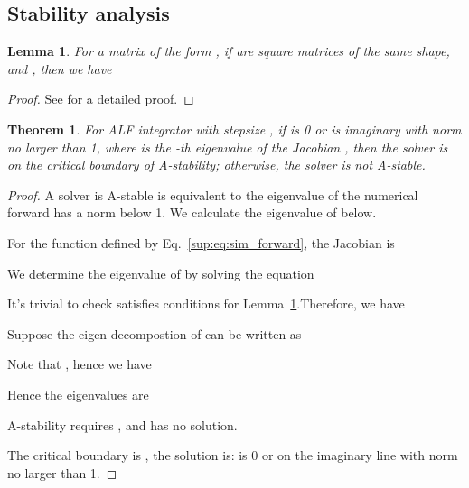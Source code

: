 \documentclass{article} \usepackage{iclr2021_conference,times}
\newtheorem{theorem}{Theorem}[section]
\newtheorem{lemma}{Lemma}[theorem]
\begin{document}
\subsection{Stability analysis}
\label{sup:subsec:stability}
\begin{lemma}
\label{sup:lem:det}
For a matrix of the form , if  are square matrices of the same shape, and , then we have\ \ 

\end{lemma}
\begin{proof}
See \citep{silvester2000determinants} for a detailed proof.
\end{proof}
\begin{theorem}
For ALF integrator with stepsize , if  is 0 or is imaginary with norm no larger than 1, where  is the -th eigenvalue of the Jacobian , then the solver is on the critical boundary of A-stability; otherwise, the solver is not A-stable.
\end{theorem}
\begin{proof}
A solver is A-stable is equivalent to the eigenvalue of the numerical forward has a norm below 1. We calculate the eigenvalue of  below.

For the function defined by Eq.~\ref{sup:eq:sim_forward}, the Jacobian is

We determine the eigenvalue of  by solving the equation

It's trivial to check  satisfies conditions for Lemma~\ref{sup:lem:det}.Therefore, we have

Suppose the eigen-decompostion of  can be written as

Note that , hence we have

Hence the eigenvalues are 

A-stability requires , and has no solution.

The critical boundary is , the solution is:  is 0 or on the imaginary line with norm no larger than 1.
\end{proof}
\newpage
\end{document}
